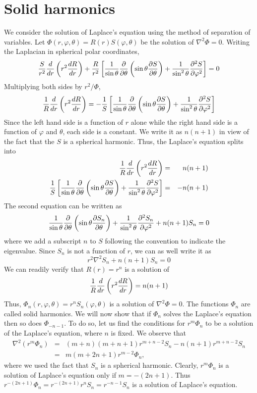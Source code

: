 \section{Solid harmonics}\label{c2sa5}
We consider the solution of Laplace's equation using the method of separation of variables. Let $\Phi(r, \varphi, \theta) = R(r)S(\varphi, \theta)$ be the solution of $\nabla^2\Phi=0$. 
Writing the Laplacian in spherical polar coordinates,
\[
\frac{S}{r^2}\frac{d}{dr}\left(r^2\frac{d{R}}{d{r}}\right) + 
\frac{R}{r^2}\left[\frac{1}{\sin\theta}\frac{\partial}{\partial\theta}\left(\sin\theta\frac{\partial{S}}{\partial{\theta}}\right) + \frac{1}{\sin^2\theta}\frac{\partial^2S}{\partial\varphi^2}\right] = 0
\]
Multiplying both sides by $r^2/\Phi$,
\[
\frac{1}{R}\frac{d}{dr}\left(r^2\frac{d{R}}{d{r}}\right) =
-\frac{1}{S}\left[\frac{1}{\sin\theta}\frac{\partial}{\partial\theta}\left(\sin\theta\frac{\partial{S}}{\partial{\theta}}\right) + \frac{1}{\sin^2\theta}\frac{\partial^2S}{\partial\varphi^2}\right]
\]
Since the left hand side is a function of $r$ alone while the right hand side is a function of $\varphi$ and $\theta$, each side is a constant. We write it as $n(n+1)$ in view of the
fact that the $S$ is a spherical harmonic. Thus, the Laplace's equation splits into
\begin{eqnarray*}
\frac{1}{R}\frac{d}{dr}\left(r^2\frac{d{R}}{d{r}}\right) &=& n(n+1) \\
\frac{1}{S}\left[\frac{1}{\sin\theta}\frac{\partial}{\partial\theta}\left(\sin\theta\frac{\partial{S}}{\partial{\theta}}\right) + \frac{1}{\sin^2\theta}\frac{\partial^2S}{\partial\varphi^2}\right] &=& -n(n+1)
\end{eqnarray*}
The second equation can be written as
\[
\frac{1}{\sin\theta}\frac{\partial}{\partial\theta}\left(\sin\theta\frac{\partial{S_n}}{\partial{\theta}}\right) + \frac{1}{\sin^2\theta}\frac{\partial^2S_n}{\partial\varphi^2} + n(n+1)S_n = 0
\]
where we add a subscript $n$ to $S$ following the convention to indicate the eigenvalue. Since $S_n$ is not a function of $r$, we can as well write it as
\[
r^2\nabla^2S_n + n(n+1)S_n = 0
\]
We can readily verify that $R(r) = r^n$ is a solution of
\[
\frac{1}{R}\frac{d}{dr}\left(r^2\frac{d{R}}{d{r}}\right) = n(n+1)
\]
Thus, $\Phi_n(r, \varphi, \theta) = r^nS_n(\varphi, \theta)$ is a solution of $\nabla^2\Phi = 0$. The functions $\Phi_n$ are called solid harmonics. We will now show that if $\Phi_n$
solves the Laplace's equation then so does $\Phi_{-n-1}$. To do so, let us find the conditions for $r^m\Phi_n$ to be a solution of the Laplace's equation, where $n$ is fixed. We
observe that
\begin{eqnarray*}
\nabla^2(r^m\Phi_n) &=& (m + n)(m + n + 1)r^{m + n - 2}S_n - n(n + 1)r^{m + n - 2}S_n \\
 &=& m(m + 2n + 1)r^{m - 2}\Phi_n,
\end{eqnarray*}
where we used the fact that $S_n$ is a spherical harmonic. Clearly, $r^m\Phi_n$ is a solution of Laplace's equation only if $m = -(2n + 1)$. Thus $r^{-(2n + 1)}\Phi_n = 
r^{-(2n + 1)}r^nS_n = r^{-n-1}S_n$ is a solution of Laplace's equation.


